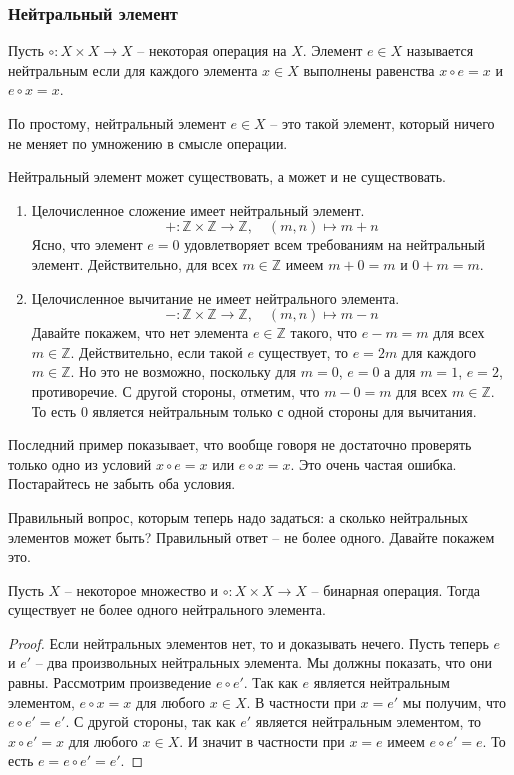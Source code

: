 \subsubsection{Нейтральный элемент}

\begin{definition}
Пусть $\circ \colon X\times X\to X$ -- некоторая операция на $X$.
Элемент $e\in X$ называется нейтральным если для каждого элемента $x\in X$ выполнены равенства $x\circ e = x$ и $e \circ x = x$.
\end{definition}

По простому, нейтральный элемент $e\in X$ -- это такой элемент, который ничего не меняет по умножению в смысле операции.

\begin{examples}
Нейтральный элемент может существовать, а может и не существовать.
\begin{enumerate}
\item Целочисленное сложение имеет нейтральный элемент.
\[
+\colon \mathbb Z\times \mathbb Z\to \mathbb Z,\quad (m,n)\mapsto m+n
\]
Ясно, что элемент $e = 0$ удовлетворяет всем требованиям на нейтральный элемент.
Действительно, для всех $m\in \mathbb Z$ имеем $m + 0 = m$ и $0 + m = m$.

\item Целочисленное вычитание не имеет нейтрального элемента.
\[
-\colon \mathbb Z\times \mathbb Z\to \mathbb Z,\quad (m,n)\mapsto m-n
\]
Давайте покажем, что нет элемента $e\in \mathbb Z$ такого, что $e - m = m$ для всех $m\in \mathbb Z$.
Действительно, если такой $e$ существует, то $e = 2m$ для каждого $m\in \mathbb Z$.
Но это не возможно, поскольку для $m = 0$, $e = 0$ а для $m = 1$, $e = 2$, противоречие.
С другой стороны, отметим, что $m - 0 = m$ для всех $m\in \mathbb Z$.
То есть $0$ является нейтральным только с одной стороны для вычитания.
\end{enumerate}
\end{examples}

Последний пример показывает, что вообще говоря не достаточно проверять только одно из условий $x \circ e = x$ или $e \circ x = x$.
Это очень частая ошибка.
Постарайтесь не забыть оба условия.

Правильный вопрос, которым теперь надо задаться: а сколько нейтральных элементов может быть?
Правильный ответ -- не более одного.
Давайте покажем это.

\begin{claim}
Пусть $X$ -- некоторое множество и $\circ \colon X\times X\to X$ -- бинарная операция.
Тогда существует не более одного нейтрального элемента.
\end{claim}
\begin{proof}
Если нейтральных элементов нет, то и доказывать нечего.
Пусть теперь $e$ и $e'$ -- два произвольных нейтральных элемента.
Мы должны показать, что они равны.
Рассмотрим произведение $e \circ e'$.
Так как $e$ является нейтральным элементом,  $e \circ x = x$ для любого $x\in X$.
В частности при  $x = e'$ мы получим, что $e \circ e' = e'$.
С другой стороны, так как $e'$ является нейтральным элементом, то $x \circ e' = x$ для любого $x\in X$.
И значит в частности при $x = e$ имеем $e \circ e' = e$.
То есть $e = e\circ e' = e'$.
\end{proof}

